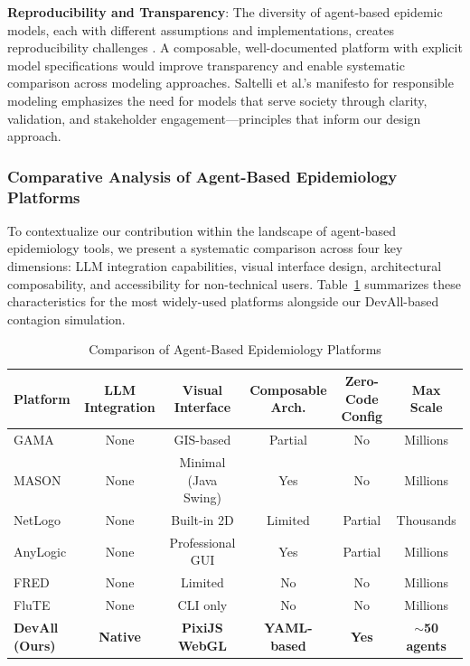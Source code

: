 \textbf{Reproducibility and Transparency}: The diversity of agent-based epidemic models, each with different assumptions and implementations, creates reproducibility challenges \cite{silva2020covid}. A composable, well-documented platform with explicit model specifications would improve transparency and enable systematic comparison across modeling approaches. Saltelli et al.'s manifesto for responsible modeling \cite{saltelli2020five} emphasizes the need for models that serve society through clarity, validation, and stakeholder engagement---principles that inform our design approach.

\subsubsection{Comparative Analysis of Agent-Based Epidemiology Platforms}

To contextualize our contribution within the landscape of agent-based epidemiology tools, we present a systematic comparison across four key dimensions: LLM integration capabilities, visual interface design, architectural composability, and accessibility for non-technical users. Table~\ref{tab:platform-comparison} summarizes these characteristics for the most widely-used platforms alongside our DevAll-based contagion simulation.

\begin{table}[t]
\centering
\caption{Comparison of Agent-Based Epidemiology Platforms}
\label{tab:platform-comparison}
\begin{tabular}{@{}lccccc@{}}
\toprule
\textbf{Platform} & \textbf{LLM Integration} & \textbf{Visual Interface} & \textbf{Composable Arch.} & \textbf{Zero-Code Config} & \textbf{Max Scale} \\
\midrule
GAMA \cite{grignard2013gama} & None & GIS-based & Partial & No & Millions \\
MASON \cite{luke2005mason} & None & Minimal (Java Swing) & Yes & No & Millions \\
NetLogo \cite{wilensky1999netlogo} & None & Built-in 2D & Limited & Partial & Thousands \\
AnyLogic \cite{borshchev2013anylogic} & None & Professional GUI & Yes & Partial & Millions \\
FRED \cite{grefenstette2013fred} & None & Limited & No & No & Millions \\
FluTE \cite{chao2020modeling} & None & CLI only & No & No & Millions \\
\textbf{DevAll (Ours)} & \textbf{Native} & \textbf{PixiJS WebGL} & \textbf{YAML-based} & \textbf{Yes} & \textbf{$\sim$50 agents} \\
\bottomrule
\end{tabular}
\end{table}

